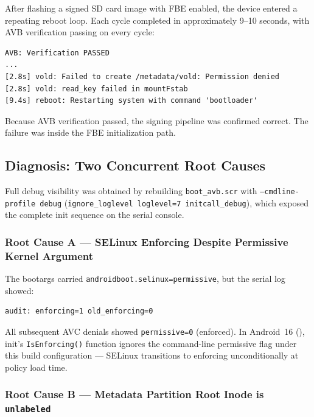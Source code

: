 After flashing a signed SD card image with FBE enabled, the device entered a repeating reboot loop. Each cycle completed in approximately 9--10 seconds, with AVB verification passing on every cycle:

\begin{lstlisting}[caption={Reboot loop symptom on UART console}]
AVB: Verification PASSED
...
[2.8s] vold: Failed to create /metadata/vold: Permission denied
[2.8s] vold: read_key failed in mountFstab
[9.4s] reboot: Restarting system with command 'bootloader'
\end{lstlisting}

Because AVB verification passed, the signing pipeline was confirmed correct. The failure was inside the FBE initialization path.

\subsection{Diagnosis: Two Concurrent Root Causes}

Full debug visibility was obtained by rebuilding \texttt{boot\_avb.scr} with \texttt{--cmdline-profile debug} (\texttt{ignore\_loglevel loglevel=7 initcall\_debug}), which exposed the complete init sequence on the serial console.

\subsubsection{Root Cause A --- SELinux Enforcing Despite Permissive Kernel Argument}

The bootargs carried \texttt{androidboot.selinux=permissive}, but the serial log showed:

\begin{lstlisting}
audit: enforcing=1 old_enforcing=0
\end{lstlisting}

\begin{sloppypar}
All subsequent AVC denials showed \texttt{permissive=0} (enforced). In Android~16 (), init's \texttt{IsEnforcing()} function ignores the command-line permissive flag under this build configuration --- SELinux transitions to enforcing unconditionally at policy load time.
\end{sloppypar}

\subsubsection{Root Cause B --- Metadata Partition Root Inode is \texttt{unlabeled}}

